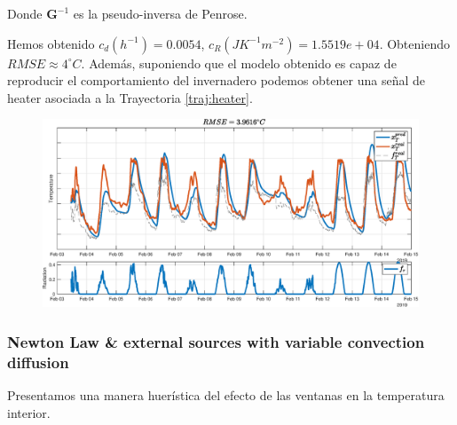     Donde $\bm{G}^{-1}$ es la pseudo-inversa de Penrose. 
    \newline
    
    Hemos obtenido $c_d(h^{-1}) = 0.0054$, $ c_R(JK^{-1}m^{-2}) = 1.5519e+04$. Obteniendo $RMSE \approx 4 ^\circ C$. Además, suponiendo que el modelo obtenido es capaz de reproducir el comportamiento del invernadero podemos obtener una señal de heater asociada a la Trayectoria \ref{traj:heater}.
    
    
    \begin{figure}
        \centering
        \includegraphics[scale=0.5]{img/model-2.1.1.eps}
    \end{figure}
    
    
    \subsubsection{Newton Law \& external sources with variable convection diffusion}
    Presentamos una manera huerística del efecto de las ventanas en la temperatura interior.
    
    
    
